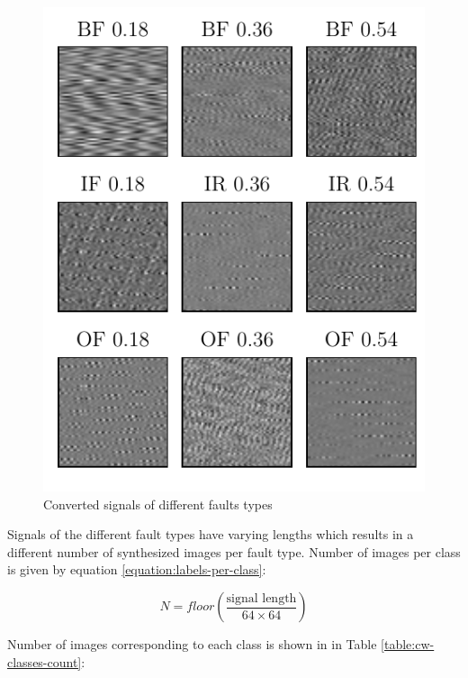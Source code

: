 \begin{figure}[h]
    \centering
	\includegraphics{figures/cw_bearings_faults_samples.pdf}
    \caption{Converted signals of different faults types}
    \label{fig:bearings_faults_samples}
\end{figure}

Signals of the different fault types have varying lengths which results in a different number of synthesized images per fault type. Number of images per class is given by equation \ref{equation:labels-per-class}:

\begin{equation}
	N=floor \left(\frac{\text{signal length}}{64\times64}\right)
	\label{equation:labels-per-class}
\end{equation}

Number of images corresponding to each class is shown in in Table \ref{table:cw-classes-count}:

